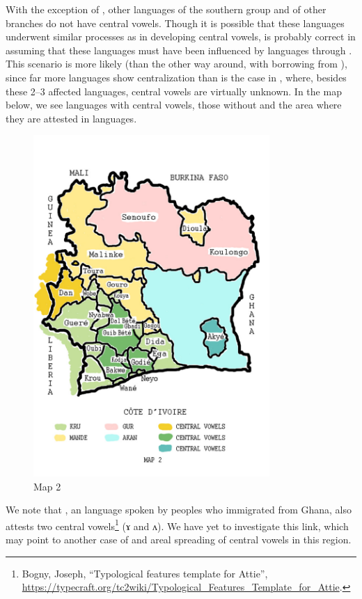 \documentclass[output=paper,newtxmath,modfonts,nonflat]{langsci/langscibook}
\begin{document}
With the exception of , other languages of the southern  group and of other  branches do not have central vowels.  Though it is possible that these languages underwent similar processes as  in developing central vowels, \citet{Vydrine2009} is probably correct in assuming that these languages must have been influenced by  languages through . This scenario is more likely (than the other way around, with  borrowing from ), since far more  languages show centralization than is the case in , where, besides these 2–3 affected languages, central vowels are virtually unknown.  In the map below, we see  languages with central vowels, those without and the area where they are attested in  languages. 

\begin{figure}
\includegraphics[width=0.8\textwidth]{figures/fig-zogbo-2.png}
\caption{Map 2}
\end{figure}  

We note that , an  language spoken by peoples who immigrated from Ghana, also attests two central vowels\footnote{Bogny, Joseph, “Typological features template for Attie”, \url{https://typecraft.org/tc2wiki/Typological_Features_Template_for_Attie}.} (ɤ and ʌ).  We have yet to investigate this link, which may point to another case of  and areal spreading of central vowels in this region.
\end{document}

